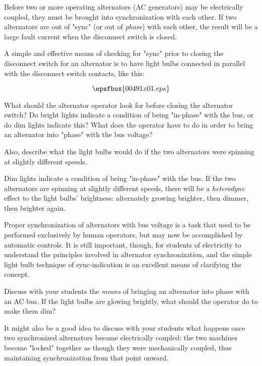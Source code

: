 

Before two or more operating alternators (AC generators) may be electrically coupled, they must be brought into synchronization with each other.  If two alternators are out of "sync" (or out of {\it phase}) with each other, the result will be a large fault current when the disconnect switch is closed.

A simple and effective means of checking for "sync" prior to closing the disconnect switch for an alternator is to have light bulbs connected in parallel with the disconnect switch contacts, like this:

$$\epsfbox{00491x01.eps}$$

What should the alternator operator look for before closing the alternator switch?  Do bright lights indicate a condition of being "in-phase" with the bus, or do dim lights indicate this?  What does the operator have to do in order to bring an alternator into "phase" with the bus voltage?

Also, describe what the light bulbs would do if the two alternators were spinning at slightly different speeds.







Dim lights indicate a condition of being "in-phase" with the bus.  If the two alternators are spinning at slightly different speeds, there will be a {\it heterodyne} effect to the light bulbs' brightness: alternately growing brighter, then dimmer, then brighter again.







Proper synchronization of alternators with bus voltage is a task that used to be performed exclusively by human operators, but may now be accomplished by automatic controls.  It is still important, though, for students of electricity to understand the principles involved in alternator synchronization, and the simple light bulb technique of sync-indication is an excellent means of clarifying the concept.

Discuss with your students the {\it means} of bringing an alternator into phase with an AC bus.  If the light bulbs are glowing brightly, what should the operator do to make them dim?

It might also be a good idea to discuss with your students what happens once two synchronized alternators become electrically coupled: the two machines become "locked" together as though they were mechanically coupled, thus maintaining synchronization from that point onward.




